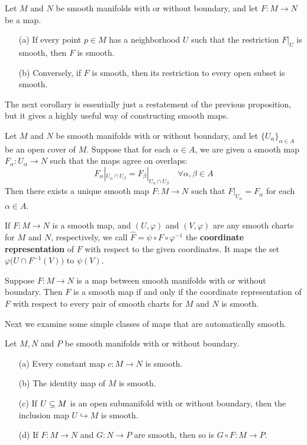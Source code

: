 \begin{proposition}
Let $M$ and $N$ be smooth manifolds with or without boundary, and let $F :M\to N$ be a map.
\begin{itemize}
\item[(a)]If every point $p\in M$ has a neighborhood $U$ such that the restriction $F|_U$ is smooth, then $F$ is smooth.
\item[(b)]Conversely, if $F$ is smooth, then its restriction to every open subset is smooth.
\end{itemize}
\end{proposition}
The next corollary is essentially just a restatement of the previous proposition,
but it gives a highly useful way of constructing smooth maps.
\begin{lemma}
Let $M$ and $N$ be smooth manifolds with or without boundary, and let $\{U_\alpha\}_{\alpha\in A}$ be an open cover of $M$. Suppose that for each $\alpha\in A$, we are given a smooth map $F_\alpha:U_\alpha\to N$ such that the maps agree on overlaps:
\[F_\alpha|_{U_\alpha\cap U_\beta}=F_\beta|_{U_\alpha\cap U_\beta}\quad\forall\alpha,\beta\in A\]
Then there exists a unique smooth map $F:M\to N$ such that $F|_{U_\alpha}=F_\alpha$ for each $\alpha\in A$.
\end{lemma}
If $F:M\to N$ is a smooth map, and $(U,\varphi)$ and $(V,\varphi)$ are any smooth charts for $M$ and $N$, respectively, we call $\widehat{F}=\psi\circ F\circ\varphi^{-1}$ the \textbf{coordinate representation} of $F$ with respect to the given coordinates. It maps the set $\varphi\big(U\cap F^{-1}(V)\big)$ to $\psi(V)$.\par
\begin{proposition}\label{smooth map iff}
Suppose $F:M\to N$ is a map between smooth manifolds with or without boundary. Then $F$ is a smooth map if and only if the coordinate representation of $F$ with respect to every pair of smooth charts for $M$ and $N$ is smooth.
\end{proposition}
Next we examine some simple classes of maps that are automatically smooth.
\begin{proposition}
Let $M,N$ and $P$ be smooth manifolds with or without boundary.
\begin{itemize}
\item[(a)]Every constant map $c:M\to N$ is smooth.
\item[(b)]The identity map of $M$ is smooth.
\item[(c)]If $U\subseteq M$ is an open submanifold with or without boundary, then the inclusion map $U\hookrightarrow M$ is smooth.
\item[(d)]If $F:M\to N$ and $G:N\to P$ are smooth, then so is $G\circ F:M\to P$.
\end{itemize}
\end{proposition}
